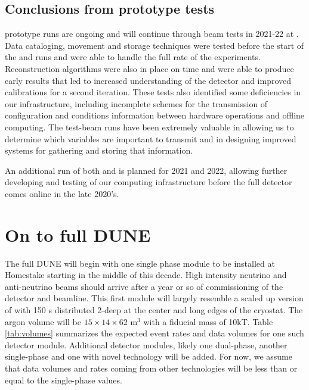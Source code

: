 \subsection{Conclusions from prototype tests}
 prototype runs are ongoing and will continue through beam tests in 2021-22 at .  Data cataloging, movement and storage techniques were tested before the start of the  and   runs and were able to handle the full rate of the experiments.   Reconstruction algorithms were also in place on time and were able to produce early results that led to increased understanding of the detector and improved calibrations for a second iteration.  These tests also identified some deficiencies in our infrastructure, including incomplete schemes for the transmission of configuration and conditions information between hardware operations and  offline computing.  The test-beam runs have been extremely valuable in allowing us to determine which variables are important to transmit and in designing improved systems for gathering and storing that information. 

An additional run of both  and  is planned for 2021 and 2022, allowing further developing and testing of our computing infrastructure before the full detector comes online in the late 2020's. 


\section{On to full DUNE}

The full DUNE  will begin with one single phase module to be installed at Homestake starting in the middle of  this decade.  High intensity neutrino and anti-neutrino beams should arrive after a year or so of commissioning of the detector and  beamline.  This first module will largely resemble a scaled up version of  with 150 s distributed 2-deep at the center and long edges of the cryostat.   The argon volume will be $15\times14\times62$ m$^3$ with a fiducial mass of 10kT.  Table \ref{tab:volumes} summarizes the expected event rates and data volumes for one such detector module.  Additional detector modules, likely one dual-phase, another single-phase and  one with novel technology will be added.  For now, we assume that data volumes and rates coming from other technologies will be less than or equal to the single-phase values. 



